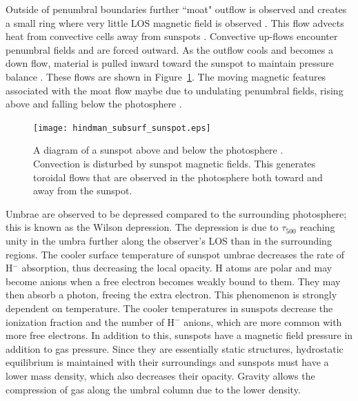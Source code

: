 Outside of penumbral boundaries further ``moat" outflow is observed and creates a small ring where very little \gls{LOS} magnetic field is observed \citep{Brickhouse:1988}. This flow advects heat from convective cells away from sunspots \citep{Fox:1991}. Convective up-flows encounter penumbral fields and are forced outward. As the outflow cools and becomes a down flow, material is pulled inward toward the sunspot to maintain pressure balance \citep{Hindman:2009}. These flows are shown in Figure~\ref{fig:sunspotstruct}. The moving magnetic features associated with the moat flow maybe due to undulating penumbral fields, rising above and falling below the photosphere \citep{Weiss:2006}.

\begin{figure}[t]
\centerline{\texttt{[image: hindman\_subsurf\_sunspot.eps]}}
\caption[A diagram of a sunspot above and below the photosphere.]{A diagram of a sunspot above and below the photosphere \citep[from][]{Hindman:2009}. Convection is disturbed by sunspot magnetic fields. This generates toroidal flows that are observed in the photosphere both toward and away from the sunspot.}
\label{fig:sunspotstruct}
\end{figure}


Umbrae are observed to be depressed compared to the surrounding photosphere; this is known as the Wilson depression. The depression is due to $\tau_{500}$ reaching unity in the umbra further along the observer's LOS than in the surrounding regions. The cooler surface temperature of sunspot umbrae decreases the rate of H$^{-}$ absorption, thus decreasing the local opacity. H atoms are polar and may become anions when a free electron becomes weakly bound to them. They may then absorb a photon, freeing the extra electron. This phenomenon is strongly dependent on temperature. 
The cooler temperatures in sunspots decrease the ionization fraction and the number of H$^{-}$ anions, which are more common with more free electrons. 
In addition to this, sunspots have a magnetic field pressure in addition to gas pressure. Since they are essentially static structures, hydrostatic equilibrium is maintained with their surroundings and sunspots must have a lower mass density, which also decreases their opacity. Gravity allows the compression of gas along the umbral column due to the lower density. %


